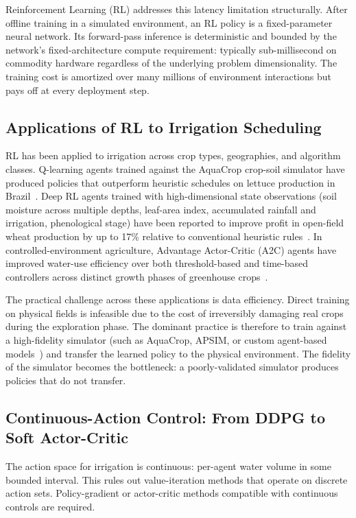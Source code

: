 Reinforcement Learning (RL) addresses this latency limitation
structurally. After offline training in a simulated environment, an
RL policy is a fixed-parameter neural network. Its forward-pass
inference is deterministic and bounded by the network's
fixed-architecture compute requirement: typically sub-millisecond on
commodity hardware regardless of the underlying problem
dimensionality. The training cost is amortized over many millions of
environment interactions but pays off at every deployment step.

\subsection{Applications of RL to Irrigation Scheduling}
\label{ssec:lit-rl-applications}

RL has been applied to irrigation across crop types, geographies,
and algorithm classes. Q-learning agents trained against the
AquaCrop crop-soil simulator have produced policies that outperform
heuristic schedules on lettuce production in Brazil~\cite{Sharma2025}.
Deep RL agents trained with high-dimensional state observations
(soil moisture across multiple depths, leaf-area index, accumulated
rainfall and irrigation, phenological stage) have been reported to
improve profit in open-field wheat production by up to 17\% relative
to conventional heuristic rules~\cite{Bayar2025,Hu2025}. In
controlled-environment agriculture, Advantage Actor-Critic (A2C)
agents have improved water-use efficiency over both threshold-based
and time-based controllers across distinct growth phases of
greenhouse crops~\cite{Bayar2025}.

The practical challenge across these applications is data efficiency.
Direct training on physical fields is infeasible due to the cost of
irreversibly damaging real crops during the exploration phase. The
dominant practice is therefore to train against a high-fidelity
simulator (such as AquaCrop, APSIM, or custom agent-based
models~\cite{Lopezjimenez2024}) and transfer the learned policy to
the physical environment. The fidelity of the simulator becomes the
bottleneck: a poorly-validated simulator produces policies that do
not transfer.

\subsection{Continuous-Action Control: From DDPG to Soft Actor-Critic}
\label{ssec:lit-rl-sac}

The action space for irrigation is continuous: per-agent water
volume in some bounded interval. This rules out value-iteration
methods that operate on discrete action sets. Policy-gradient or
actor-critic methods compatible with continuous controls are
required.


